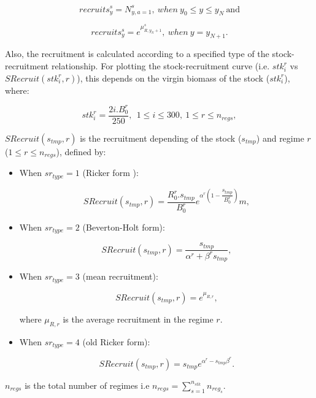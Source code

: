 \documentclass{article}
\begin{document}
\begin{equation}
    recruits^s_y =N^s_{y,a = 1}, \ when \ y_0\leq y \leq y_N\  \text{and}
\end{equation}

\begin{equation}
    recruits^s_{y}=e^{\mu^s_{R,y_N+1}}, \ when \ y = y_{N+1}.
\end{equation}

Also, the recruitment is calculated according to a specified type of the stock-recruitment relationship. For plotting the stock-recruitment curve (i.e. $stk^r_i$ vs $SRecruit(stk^r_i, r)$), this depends on the virgin biomass of the stock ($stk_i^r$), where:

\begin{equation}
stk^r_i=\dfrac{2i . B^{r}_0}{250}, \ \ 1\leq i \leq 300, \ 1\leq r \leq n_{regs},
\end{equation}

$SRecruit(s_{tmp}, r)$ is the recruitment depending of the stock ($s_{tmp}$) and regime $r$ ($1\leq r \leq n_{regs}$), defined by:
\begin{itemize}

\item When $sr_{type}=1$ (Ricker form%
):

    \begin{equation} \label{srecruit}
    SRecruit(s_{tmp}, r) = \dfrac{R^{r}_0 .s_{tmp}}{B^{r}_0}e^{\alpha^r \left(1-\dfrac{s_{tmp}}{B^{r}_0}\right)}m,
    \end{equation}

\item When $sr_{type}=2$ (Beverton-Holt form):

    \begin{equation}
    SRecruit(s_{tmp}, r) = \dfrac{s_{tmp}}{\alpha^r+\beta^r s_{tmp}},
    \end{equation}

\item When $sr_{type}=3$ (mean recruitment):

    \begin{equation}
    SRecruit(s_{tmp}, r) = e^{\mu_{R,r}},
    \end{equation}

    where $\mu_{R,r}$ is the average recruitment in the regime $r$.

\item When $sr_{type}=4$ (old Ricker form):

    \begin{equation}
    SRecruit(s_{tmp}, r) =  s_{tmp} e^{\alpha^r-s_{tmp} \beta^r}.
    \end{equation}

\end{itemize}
$n_{regs}$ is the total number of regimes i.e $n_{regs} = \displaystyle\sum_{s=1}^{n_{stk}} n_{reg_s}$.
\end{document}
